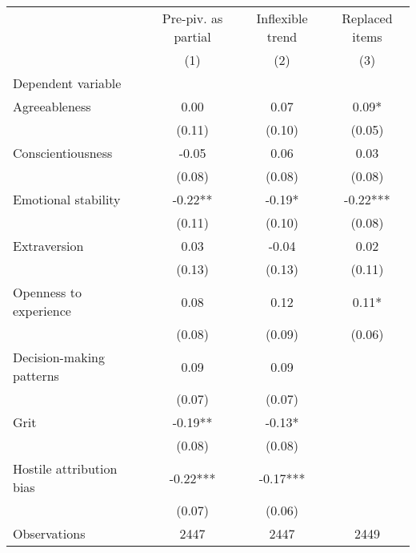 \begin{tabular}{lccc}%
    \hline%
    \hline%
    &Pre-piv. as partial&Inflexible trend&Replaced items\\%
    &(1)&(2)&(3)\\%
    \hline%
    Dependent variable&&&\\%
    Agreeableness&0.00&0.07&0.09*\\%
    &(0.11)&(0.10)&(0.05)\\%
    Conscientiousness&{-}0.05&0.06&0.03\\%
    &(0.08)&(0.08)&(0.08)\\%
    Emotional stability&{-}0.22**&{-}0.19*&{-}0.22***\\%
    &(0.11)&(0.10)&(0.08)\\%
    Extraversion&0.03&{-}0.04&0.02\\%
    &(0.13)&(0.13)&(0.11)\\%
    Openness to experience&0.08&0.12&0.11*\\%
    &(0.08)&(0.09)&(0.06)\\%
    Decision{-}making patterns&0.09&0.09&\\%
    &(0.07)&(0.07)&\\%
    Grit&{-}0.19**&{-}0.13*&\\%
    &(0.08)&(0.08)&\\%
    Hostile attribution bias&{-}0.22***&{-}0.17***&\\%
    &(0.07)&(0.06)&\\%
    \hline%
    Observations&2447&2447&2449\\%
    \hline%
    \hline%
    \end{tabular}
